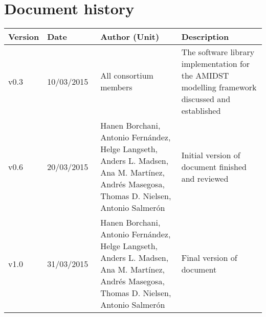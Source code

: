 \documentclass[11pt, oneside]{article}   	%
\numberwithin{figure}{section}
\numberwithin{equation}{section}
\numberwithin{table}{section}
\begin{document}


\tableofcontents

\newpage

\section*{Document history}

\begin{table}[htbp]
  \centering
  \begin{tabularx}{\linewidth}{|p{13mm}| p{18mm}| X | X |} \hline
    {\bf Version} & {\bf Date} & {\bf Author (Unit)} & {\bf Description} \\ \hline
    v0.3 & 10/03/2015~ & All consortium members & The software library implementation for the AMIDST modelling framework discussed and established \\ \hline
    v0.6 & 20/03/2015~ & Hanen Borchani, Antonio Fern\'andez, Helge Langseth, Anders L. Madsen, Ana M. Mart\'inez, Andr\'es Masegosa, Thomas D. Nielsen, Antonio Salmer\'on & Initial version of document finished and reviewed  \\ \hline
    v1.0 & 31/03/2015~ & Hanen Borchani, Antonio Fern\'andez, Helge Langseth, Anders L. Madsen, Ana M. Mart\'inez, Andr\'es Masegosa, Thomas D. Nielsen, Antonio Salmer\'on & Final version of document  \\ \hline
  \end{tabularx}
\end{table}

\newpage



\newpage










\end{document}
